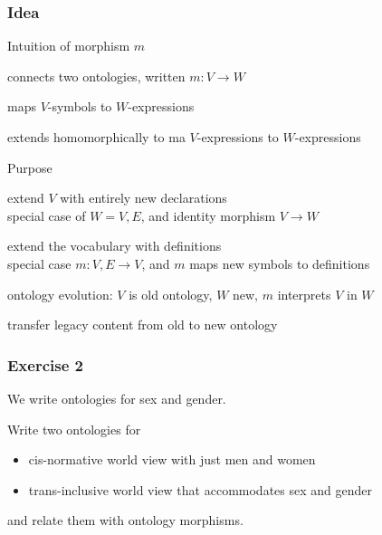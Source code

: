 \begin{frame}\frametitle{Idea}
\begin{blockitems}{Intuition of morphism $m$}
\item connects two ontologies, written $m:V\to W$
\item maps $V$-symbols to $W$-expressions
\item extends homomorphically to ma $V$-expressions to $W$-expressions
\end{blockitems}

\begin{blockitems}{Purpose}
\item extend $V$ with entirely new declarations \\
  special case of $W=V,E$, and identity morphism $V\to W$
\item extend the vocabulary with definitions \\
   special case $m:V,E\to V$, and $m$ maps new symbols to definitions
\item ontology evolution: $V$ is old ontology, $W$ new, $m$ interprets $V$ in $W$
\item transfer legacy content from old to new ontology
\end{blockitems}
\end{frame}

\begin{frame}[fragile]\frametitle{Exercise 2}
We write ontologies for sex and gender.

Write two ontologies for
\begin{itemize}
\item cis-normative world view with just men and women
\item trans-inclusive world view that accommodates sex and gender
\end{itemize}
and relate them with ontology morphisms.
\end{frame}

